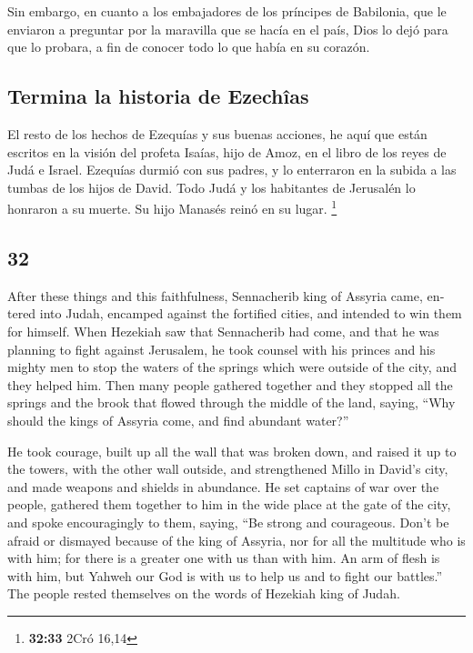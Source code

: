 \begin{paracol}{2}
 Sin embargo, en cuanto a los embajadores de los
príncipes de Babilonia, que le enviaron a preguntar por la maravilla que
se hacía en el país, Dios lo dejó para que lo probara, a fin de conocer
todo lo que había en su corazón.

\hypertarget{termina-la-historia-de-ezechuxeeas}{%
\subsection{Termina la historia de
Ezechîas}\label{termina-la-historia-de-ezechuxeeas}}

 El resto de los hechos de Ezequías y sus buenas
acciones, he aquí que están escritos en la visión del profeta Isaías,
hijo de Amoz, en el libro de los reyes de Judá e Israel. 
Ezequías durmió con sus padres, y lo enterraron en la subida a las
tumbas de los hijos de David. Todo Judá y los habitantes de Jerusalén lo
honraron a su muerte. Su hijo Manasés reinó en su lugar. \footnote{\textbf{32:33}
  2Cró 16,14}

\switchcolumn
\begin{otherlanguage}{english}

\hypertarget{section-63}{%
\section{32}\label{section-63}}

 After these things and this faithfulness, Sennacherib
king of Assyria came, entered into Judah, encamped against the fortified
cities, and intended to win them for himself.  When
Hezekiah saw that Sennacherib had come, and that he was planning to
fight against Jerusalem,  he took counsel with his princes
and his mighty men to stop the waters of the springs which were outside
of the city, and they helped him.  Then many people
gathered together and they stopped all the springs and the brook that
flowed through the middle of the land, saying, ``Why should the kings of
Assyria come, and find abundant water?''

 He took courage, built up all the wall that was broken
down, and raised it up to the towers, with the other wall outside, and
strengthened Millo in David's city, and made weapons and shields in
abundance.  He set captains of war over the people,
gathered them together to him in the wide place at the gate of the city,
and spoke encouragingly to them, saying,  ``Be strong and
courageous. Don't be afraid or dismayed because of the king of Assyria,
nor for all the multitude who is with him; for there is a greater one
with us than with him.  An arm of flesh is with him, but
Yahweh our God is with us to help us and to fight our battles.'' The
people rested themselves on the words of Hezekiah king of Judah.


\end{otherlanguage}
\end{paracol}
